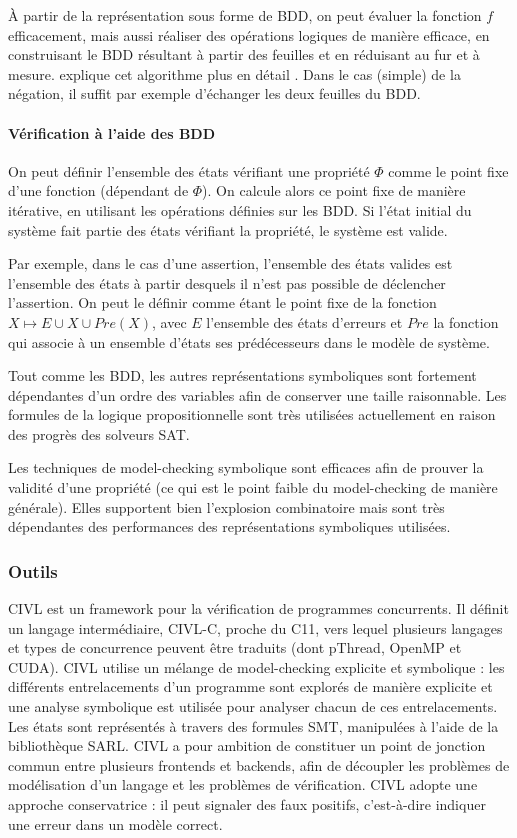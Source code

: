 À partir de la représentation sous forme de \ac{BDD}, on peut évaluer la
fonction \(f\) efficacement, mais aussi réaliser des opérations logiques
de manière efficace, en construisant le \ac{BDD} résultant à partir des
feuilles et en réduisant au fur et à mesure. \cite{OBDD} explique cet
algorithme plus en détail . Dans le cas (simple) de la
négation, il suffit par exemple d'échanger les deux feuilles du \ac{BDD}.

\paragraph{Vérification à l'aide des BDD}

On peut définir l'ensemble des états vérifiant une propriété \(\Phi\)
comme le point fixe d'une fonction (dépendant de \(\Phi\)). On calcule
alors ce point fixe de manière itérative, en utilisant les opérations définies
sur les \ac{BDD}. Si l'état initial du système fait partie des états vérifiant la
propriété, le système est valide.

Par exemple, dans le cas d'une assertion, l'ensemble des états valides
est l'ensemble des états à partir desquels il n'est pas possible de déclencher
l'assertion. On peut le définir comme étant le point fixe de la fonction
\(X \mapsto E \cup X \cup Pre(X)\), avec \(E\) l'ensemble des états
d'erreurs et \(Pre\) la fonction qui associe à un ensemble d'états ses prédécesseurs
dans le modèle de système.

Tout comme les \ac{BDD}, les autres représentations symboliques sont fortement
dépendantes d'un ordre des variables afin de conserver une taille
raisonnable. Les formules de la logique propositionnelle sont très
utilisées actuellement en raison des progrès des solveurs SAT.

Les techniques de model-checking symbolique sont efficaces afin de
prouver la validité d'une propriété (ce qui est le point faible du
model-checking de manière générale). Elles supportent bien l'explosion
combinatoire mais sont très dépendantes des performances des
représentations symboliques utilisées.

\subsubsection{Outils}

CIVL\cite{CIVL} est un framework pour la vérification de programmes concurrents.
Il définit un langage intermédiaire, CIVL-C, proche du C11, vers lequel plusieurs
langages et types de concurrence peuvent être traduits (dont pThread, OpenMP et
CUDA). CIVL utilise un mélange de model-checking explicite et symbolique : les
différents entrelacements d'un programme sont explorés de manière explicite et
une analyse symbolique est utilisée pour analyser chacun de ces entrelacements.
Les états sont représentés à travers des formules SMT, manipulées à l'aide de la
bibliothèque SARL\cite{SARL}. CIVL a pour ambition de constituer un point de
jonction commun entre plusieurs frontends et backends, afin de découpler les
problèmes de modélisation d'un langage et les problèmes de vérification. CIVL
adopte une approche conservatrice : il peut signaler des faux positifs,
c'est-à-dire indiquer une erreur dans un modèle correct.

